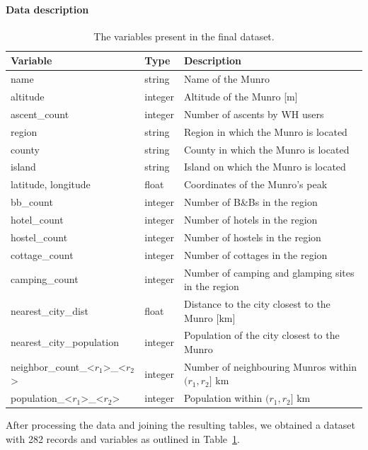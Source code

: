 \documentclass[11pt,a4paper]{article}
\begin{document}
\paragraph{Data description} 

\begin{table}[h!]
    \caption{The variables present in the final dataset.}
    \label{table:1}
    \centering
    \begin{tabular}{l  l  l} 
        \toprule
        Variable & Type & Description  \\ 
        \midrule
        name & string & Name of the Munro \\ 
        altitude & integer & Altitude of the Munro [m] \\
        ascent\_count & integer & Number of ascents by WH users\\
        \hline
        region & string & Region in which the Munro is located \\
        county & string & County in which the Munro is located\\
        island & string & Island on which the Munro is located\\
        latitude, longitude & float & Coordinates of the Munro's peak\\
        \hline
        bb\_count & integer & Number of B\&Bs in the region\\
        hotel\_count & integer & Number of hotels in the region\\
        hostel\_count & integer & Number of hostels in the region\\
        cottage\_count & integer & Number of cottages in the region\\
        camping\_count & integer & Number of camping and glamping sites in the region\\
        \hline
        nearest\_city\_dist & float & Distance to the city closest to the Munro [km]\\
        nearest\_city\_population & integer & Population of the city closest to the Munro\\
        neighbor\_count\_<$r_1$>\_<$r_2$> & integer & Number of neighbouring Munros within $(r_1,r_2]$ km\\
        population\_<$r_1$>\_<$r_2$> & integer & Population within $(r_1,r_2]$ km\\
        \bottomrule
    \end{tabular}
\end{table}

After processing the data and joining the resulting tables, we obtained a dataset with 282 records and variables as outlined in Table~\ref{table:1}.
\end{document}

